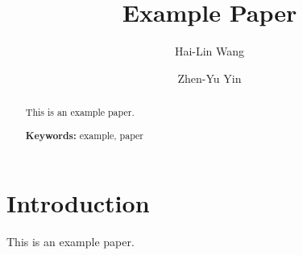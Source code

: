 \documentclass[Journal,letterpaper]{ascelike-new}
\begin{document}
\title{Example Paper}

\author[1]{Hai-Lin Wang}
\author[1,*]{Zhen-Yu Yin}


\maketitle

\begin{abstract}
This is an example paper.

\noindent
\textbf{Keywords:}  example,  paper

\end{abstract}

\hypertarget{introduction}{%
\section{Introduction}\label{introduction}}

This is an example paper.

%
%
\label{section:references}


\listoftables
\listoffigures
\end{document}

